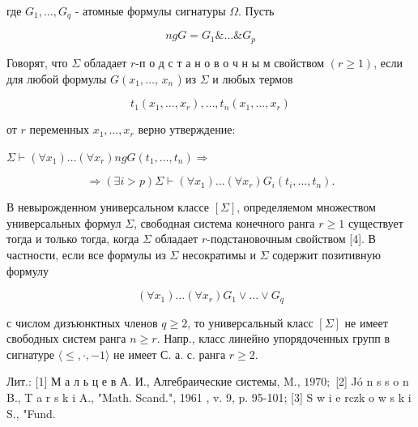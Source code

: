 \documentclass[10pt]{article}
\begin{document}
где $G_{1}, \ldots, G_{q}$ - атомные формулы сигнатуры $\Omega$. Пусть



\[

n g G=G_{1} \& \ldots \& G_{p}

\]



Говорят, что $\Sigma$ обладает $r$-п о д с т а н о в о ч н ы м свойством $(r \geqslant 1)$, если для любой формулы $G\left(x_{1}, \ldots\right.$, $x_{n}$ ) из $\Sigma$ и любых термов



\[

t_{1}\left(x_{1}, \ldots, x_{r}\right), \ldots, t_{n}\left(x_{1}, \ldots, x_{r}\right)

\]



от $r$ переменных $x_{1}, \ldots, x_{r}$ верно утверждение:



$\Sigma \vdash\left(\forall x_{1}\right) \ldots\left(\forall x_{r}\right) n g G\left(t_{1}, \ldots, t_{n}\right) \Rightarrow$



\[

\Rightarrow(\exists i>p) \Sigma \vdash\left(\forall x_{1}\right) \ldots\left(\forall x_{r}\right) G_{i}\left(t_{i}, \ldots, t_{n}\right) .

\]



В невырожденном универсальном классе $[\Sigma]$, определяемом множеством универсальных формул $\Sigma$, свободная система конечного ранга $r \geqslant 1$ существует тогда и только тогда, когда $\Sigma$ обладает $r$-подстановочным свойством [4]. В частности, если все формулы из $\Sigma$ несократимы и $\Sigma$ содержит позитивную формулу



\[

\left(\forall x_{1}\right) \ldots\left(\forall x_{r}\right) G_{1} \vee \ldots \vee G_{q}

\]



с числом дизъюнктных членов $q \geqslant 2$, то универсальный класс $[\Sigma]$ не имеет свободных систем ранга $n \geqslant r$. Напр., класс линейно упорядоченных групп в сигнатуре $\langle\leqslant, \cdot,-1\rangle$ не имеет С. а. с. ранга $r \geqslant 2$.



Лит.: [1] М а л ь ц е в А. И., Алгебраические системы, M., $1970 ;$ [2] Jó n s s o n B., T a r s k i A., "Math. Scand.", 1961 , v. 9, p. 95-101; [3] S w i e rczk o w s k i S., "Fund.
\end{document}
